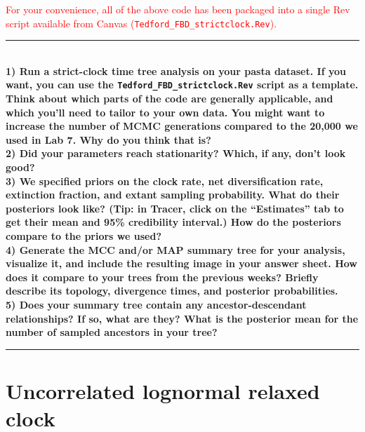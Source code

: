 \documentclass[12pt]{article}
\begin{document}
\begin{center}
\textcolor{red}{For your convenience, all of the above code has been packaged into a single Rev script available from Canvas (\texttt{Tedford\_FBD\_strictclock.Rev}).}
\end{center}

\vspace*{1ex}

\hrule
\ \\[1ex]
\textbf{1) Run a strict-clock time tree analysis on your pasta dataset. If you want, you can use the \texttt{Tedford\_FBD\_strictclock.Rev} script as a template. Think about which parts of the code are generally applicable, and which you’ll need to tailor to your own data. You might want to increase the number of MCMC generations compared to the 20,000 we used in Lab 7. Why do you think that is?} \\

\noindent \textbf{2) Did your parameters reach stationarity? Which, if any, don't look good?} \\

\noindent \textbf{3) We specified priors on the clock rate, net diversification rate, extinction fraction, and extant sampling probability. What do their posteriors look like? (Tip: in Tracer, click on the ``Estimates'' tab to get their mean and 95\% credibility interval.) How do the posteriors compare to the priors we used?} \\

\noindent \textbf{4) Generate the MCC and/or MAP summary tree for your analysis, visualize it, and include the resulting image in your answer sheet. How does it compare to your trees from the previous weeks? Briefly describe its topology, divergence times, and posterior probabilities.} \\

\noindent \textbf{5) Does your summary tree contain any ancestor-descendant relationships? If so, what are they? What is the posterior mean for the number of sampled ancestors in your tree?} \\
\hrule

\section*{Uncorrelated lognormal relaxed clock}
\end{document}
